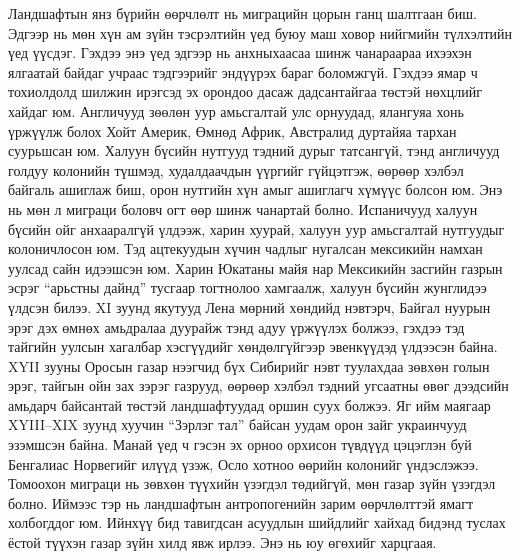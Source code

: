 Ландшафтын янз бүрийн өөрчлөлт нь миграцийн цорын ганц шалтгаан биш. Эдгээр нь мөн хүн ам зүйн тэсрэлтийн үед буюу маш ховор нийгмийн түлхэлтийн үед үүсдэг. Гэхдээ энэ үед эдгээр нь анхныхаасаа шинж чанараараа ихээхэн ялгаатай байдаг учраас тэдгээрийг эндүүрэх бараг боломжгүй. Гэхдээ ямар ч тохиолдолд шилжин ирэгсэд эх орондоо дасаж дадсантайгаа төстэй нөхцлийг хайдаг юм. Англичууд зөөлөн уур амьсгалтай улс орнуудад, ялангуяа хонь үржүүлж болох Хойт Америк, Өмнөд Африк, Австралид дуртайяа тархан суурьшсан юм. Халуун бүсийн нутгууд тэдний дурыг татсангүй, тэнд англичууд голдуу колонийн түшмэд, худалдаачдын үүргийг гүйцэтгэж, өөрөөр хэлбэл байгаль ашиглаж биш, орон нутгийн хүн амыг ашиглагч хүмүүс болсон юм. Энэ нь мөн л миграци боловч огт өөр шинж чанартай болно. Испаничууд халуун бүсийн ойг анхааралгүй үлдээж, харин хуурай, халуун уур амьсгалтай нутгуудыг колоничлосон юм. Тэд ацтекуудын хүчин чадлыг нугалсан мексикийн намхан уулсад сайн идээшсэн юм. Харин Юкатаны майя нар Мексикийн засгийн газрын эсрэг “арьстны дайнд” тусгаар тогтнолоо хамгаалж, халуун бүсийн жунглидээ үлдсэн билээ. XI зуунд якутууд Лена мөрний хөндийд нэвтэрч, Байгал нуурын эрэг дэх өмнөх амьдралаа дуурайж тэнд адуу үржүүлэх болжээ, гэхдээ тэд тайгийн уулсын хагалбар хэсгүүдийг хөндөлгүйгээр эвенкүүдэд үлдээсэн байна. XYII зууны Оросын газар нээгчид бүх Сибирийг нэвт туулахдаа зөвхөн голын эрэг, тайгын ойн зах зэрэг газрууд, өөрөөр хэлбэл тэдний угсаатны өвөг дээдсийн амьдарч байсантай төстэй ландшафтуудад оршин суух болжээ. Яг ийм маягаар XYIII–XIX зуунд хуучин “Зэрлэг тал” байсан уудам орон зайг украинчууд эзэмшсэн байна. Манай үед ч гэсэн эх орноо орхисон түвдүүд цэцэглэн буй Бенгалиас Норвегийг илүүд үзэж, Осло хотноо өөрийн колонийг үндэслэжээ.
Томоохон миграци нь зөвхөн түүхийн үзэгдэл төдийгүй, мөн газар зүйн үзэгдэл болно. Иймээс тэр нь ландшафтын антропогенийн зарим өөрчлөлттэй ямагт холбогддог юм. Ийнхүү бид тавигдсан асуудлын шийдлийг хайхад бидэнд туслах ёстой түүхэн газар зүйн хилд явж ирлээ. Энэ нь юу өгөхийг харцгаая.
